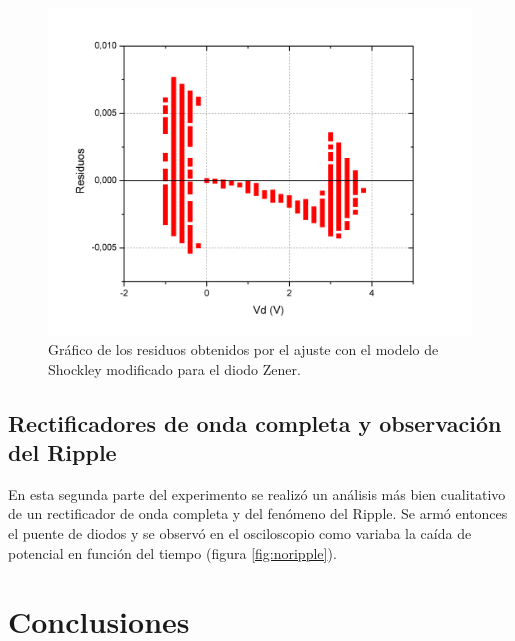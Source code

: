 \documentclass[twoside,twocolumn,a4paper]{article}
\begin{document}
\begin{figure}[H]
\includegraphics[width=\linewidth]{zener_residuos.jpg}
\captionsetup{justification=centering}
\caption{Gr\'afico de los residuos obtenidos por el ajuste con el modelo de Shockley modificado para el diodo Zener.}
\label{fig:zener_residuos}
\end{figure}


\subsection{Rectificadores de onda completa y observaci\'on del Ripple}
En esta segunda parte del experimento se realiz\'o un an\'alisis m\'as bien cualitativo de un rectificador de onda completa y del fen\'omeno del Ripple. Se arm\'o entonces el puente de diodos y se observ\'o en el osciloscopio como variaba la ca\'ida de potencial en funci\'on del tiempo (figura \ref{fig:noripple}).







\section{Conclusiones}
\end{document}
